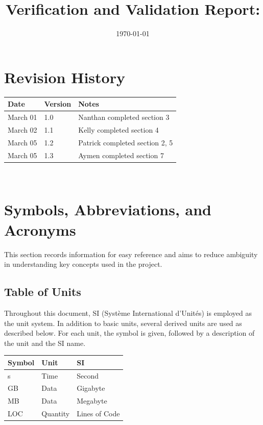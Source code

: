 \documentclass[12pt, titlepage]{article}
\begin{document}
\title{Verification and Validation Report: \progname} 
\author{\authname}
\date{\today}
	
\maketitle


\section{Revision History}

\begin{tabularx}{\textwidth}{p{3cm}p{2cm}X}
\toprule {\bf Date} & {\bf Version} & {\bf Notes}\\
\midrule
March 01 & 1.0 & Nanthan completed section 3\\
March 02 & 1.1 & Kelly completed section 4\\
March 05 & 1.2 & Patrick completed section 2, 5\\
March 05 & 1.3 & Aymen completed section 7\\
\bottomrule
\end{tabularx}

~\newpage

\section{Symbols, Abbreviations, and Acronyms}
This section records information for easy reference and aims to reduce ambiguity in understanding key concepts used in the project.

\subsection{Table of Units}

Throughout this document, SI (Système International d'Unités) is employed as the unit system. In addition to basic units, several derived units are used as described below. For each unit, the symbol is given, followed by a description of the unit and the SI name.

\renewcommand{\arraystretch}{1.2}
\noindent \begin{tabular}{l l l} 
    \toprule		
    \textbf{Symbol} & \textbf{Unit} & \textbf{SI}\\
    \midrule 
    \si{s} & Time & Second\\
    \si{GB} & Data & Gigabyte\\
    \si{MB} & Data & Megabyte\\
    \si{LOC} & Quantity & Lines of Code\\
    \bottomrule
\end{tabular}
\end{document}
